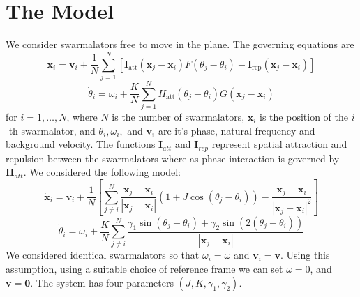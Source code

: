 \documentclass[twocolumn,10pt]{asme2ej}
\begin{document}
\section{The Model}
{
    We consider swarmalators free to move in the plane. The governing equations are     \noindent
    \begin{equation}
        \dot{\mathbf{x}}_{i}=\mathbf{v}_{i}+\frac{1}{N} \sum_{j=1}^{N}\left[\mathbf{I}_{\mathrm{att}}\left(\mathbf{x}_{j}-\mathbf{x}_{i}\right) F\left(\theta_{j}   -\theta_{i}\right)-\mathbf{I}_{\mathrm{rep}}\left(\mathbf{x}_{j}-\mathbf{x}_{i}    \right)\right]
    \end{equation}
    \begin{equation}
        \dot{\theta}_{i}=\omega_{i}+\frac{K}{N} \sum_{j=1}^{N} H_{\mathrm{att}}\left(\theta_{j}-\theta_{i}\right) G\left(\mathbf{x}_{j}-\mathbf{x}_{i}\right)
    \end{equation}
    for \(i = 1,\ldots,N\), where \(N\) is the number of swarmalators, $\mathbf{x}_{i} $ is the position of the \(i\)-th swarmalator, and $\theta_i,\omega_i,$ and $\mathbf{v}_i$ are it's phase, natural frequency and background velocity. The functions $\mathbf{I}_  {att}$ and $\mathbf{I}_{rep}$ represent spatial attraction and repulsion between the swarmalators where as phase interaction is governed by $\mathbf{H}_{att}$. We considered the following model:
    \begin{equation}
        \dot{\mathbf{x}}_{i}=\mathbf{v}_{i}+\frac{1}{N}\left[\sum_{j \neq i}^{N} \frac  {\mathbf{x}_{j}-\mathbf{x}_{i}}{\left|\mathbf{x}_{j}-\mathbf{x}_{i}\right|}\left  (1+J \cos \left(\theta_{j}-\theta_{i}\right)\right)-\frac{\mathbf{x}_{j}-\mathbf{x}_{i}}{\left|\mathbf{x}_{j}-\mathbf{x}_{i}\right|^{2}}\right]
    \end{equation}
    \begin{equation} \label{eq:phase}
        \dot{\theta}_{i}=\omega_{i}+\frac{K}{N} \sum_{j \neq i}^{N} \frac{\gamma_1 \sin\left(\theta_{j}-\theta_{i}\right) + \gamma_2 \sin \left(2 \left(\theta_j -\theta_i\right)\right) }{\left|\mathbf{x}_{j}-\mathbf{x}_{i}\right|} 
    \end{equation}
    We considered identical swarmalators so that $\omega_i = \omega$ and $\mathbf{v}_i = \mathbf{v}$. Using this assumption, using a suitable choice of reference frame we  can set $\omega = 0$, and $\mathbf{v} = \mathbf{0}$. The system has four parameters $\left(J,K,\gamma_1,\gamma_2\right )$.

}
\end{document}
